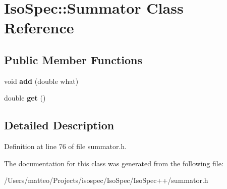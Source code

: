 \hypertarget{class_iso_spec_1_1_summator}{}\section{Iso\+Spec\+:\+:Summator Class Reference}
\label{class_iso_spec_1_1_summator}
\subsection*{Public Member Functions}
\begin{DoxyCompactItemize}
\item 
\mbox{\label{class_iso_spec_1_1_summator_a1b032359eb84e5788ab31c3ad3932008}} 
void {\bfseries add} (double what)
\item 
\mbox{\label{class_iso_spec_1_1_summator_a87f3249839e99b41d3c16aeed75204fa}} 
double {\bfseries get} ()
\end{DoxyCompactItemize}


\subsection{Detailed Description}


Definition at line 76 of file summator.\+h.



The documentation for this class was generated from the following file\+:\begin{DoxyCompactItemize}
\item 
/\+Users/matteo/\+Projects/isospec/\+Iso\+Spec/\+Iso\+Spec++/summator.\+h\end{DoxyCompactItemize}
